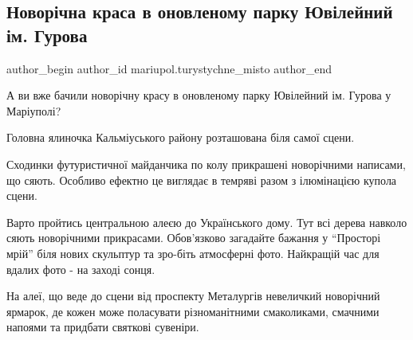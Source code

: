  
 
 
 
 

\subsection{Новорічна краса в оновленому парку Ювілейний ім. Гурова}
\label{sec:24_12_2021.fb.mariupol.turystychne_misto.1.novorichna_krasa_park_gurova}

\ifcmt
 author_begin
   author_id mariupol.turystychne_misto
 author_end
\fi

А ви вже бачили новорічну красу в оновленому парку Ювілейний ім. Гурова у
Маріуполі?

Головна ялиночка Кальміуського району розташована біля самої сцени.

Сходинки футуристичної майданчика по колу прикрашені новорічними написами, що
сяють. Особливо ефектно це виглядає  в темряві разом з ілюмінацією купола
сцени. 

Варто пройтись центральною алеєю до Українського дому. Тут всі дерева навколо
сяють новорічними прикрасами. Обов'язково  загадайте бажання у
\enquote{Просторі мрій} біля нових скульптур та зро\hyp{}біть атмосферні фото.
Найкращій час для вдалих фото - на заході сонця.

На алеї, що веде до сцени від проспекту Металургів невеличкий новорічний
ярмарок, де кожен  може поласувати різноманітними смаколиками, смачними напоями
та придбати святкові сувеніри.
